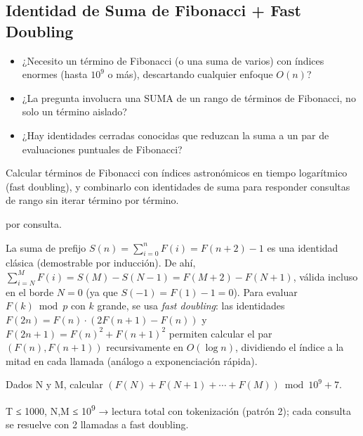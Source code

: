\subsection{Identidad de Suma de Fibonacci + Fast Doubling}


\begin{itemize}
\item ¿Necesito un término de Fibonacci (o una suma de varios) con índices enormes (hasta $10^9$ o más), descartando cualquier enfoque $O(n)$?
\item ¿La pregunta involucra una SUMA de un rango de términos de Fibonacci, no solo un término aislado?
\item ¿Hay identidades cerradas conocidas que reduzcan la suma a un par de evaluaciones puntuales de Fibonacci?
\end{itemize}

 Calcular términos de Fibonacci con índices astronómicos en tiempo logarítmico (fast doubling), y combinarlo con identidades de suma para responder consultas de rango sin iterar término por término.

  por consulta.

 La suma de prefijo $S(n) = \sum_{i=0}^{n} F(i) = F(n+2) - 1$ es una identidad clásica (demostrable por inducción). De ahí, $\sum_{i=N}^{M} F(i) = S(M) - S(N-1) = F(M+2) - F(N+1)$, válida incluso en el borde $N=0$ (ya que $S(-1)=F(1)-1=0$). Para evaluar $F(k) \bmod p$ con $k$ grande, se usa \emph{fast doubling}: las identidades $F(2n) = F(n)\cdot(2F(n+1)-F(n))$ y $F(2n+1) = F(n)^2 + F(n+1)^2$ permiten calcular el par $(F(n), F(n+1))$ recursivamente en $O(\log n)$, dividiendo el índice a la mitad en cada llamada (análogo a exponenciación rápida).


Dados N y M, calcular $(F(N) + F(N+1) + \cdots + F(M)) \bmod 10^9+7$.

 T ≤ 1000, N,M ≤ 10\textsuperscript{9} → lectura total con tokenización (patrón 2); cada consulta se resuelve con 2 llamadas a fast doubling.



